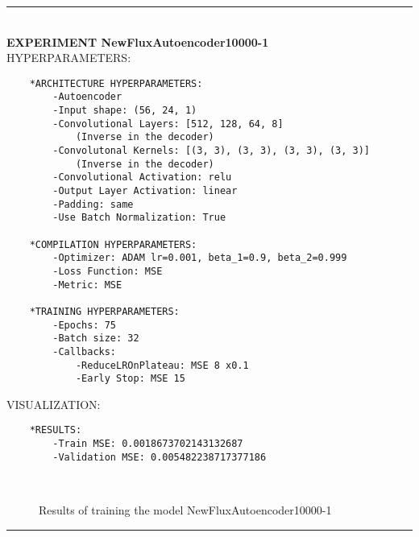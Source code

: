 \rule{0.5\textwidth}{0.5pt}\\

	{\large \textbf{EXPERIMENT NewFluxAutoencoder10000-1}}\\
	
	{\normalsize HYPERPARAMETERS:}
	\begin{lstlisting}
	*ARCHITECTURE HYPERPARAMETERS:
		-Autoencoder
		-Input shape: (56, 24, 1)
		-Convolutional Layers: [512, 128, 64, 8]
			(Inverse in the decoder)
		-Convolutonal Kernels: [(3, 3), (3, 3), (3, 3), (3, 3)] 
			(Inverse in the decoder)
		-Convolutional Activation: relu
		-Output Layer Activation: linear
		-Padding: same
		-Use Batch Normalization: True
	
	*COMPILATION HYPERPARAMETERS:
		-Optimizer: ADAM lr=0.001, beta_1=0.9, beta_2=0.999
		-Loss Function: MSE
		-Metric: MSE
	
	*TRAINING HYPERPARAMETERS:
		-Epochs: 75
		-Batch size: 32
		-Callbacks:
			-ReduceLROnPlateau: MSE 8 x0.1
			-Early Stop: MSE 15
	\end{lstlisting}
	
	{\normalsize VISUALIZATION:}
	\begin{lstlisting}
	*RESULTS:
        -Train MSE: 0.0018673702143132687
        -Validation MSE: 0.005482238717377186
	\end{lstlisting}
	
	\begin{figure*}[ht!]
		\hspace{\fill}
		\hspace{\fill}	
		\\
		\caption{Results of training the model NewFluxAutoencoder10000-1}
	\end{figure*}
	
\FloatBarrier	
\rule{0.5\textwidth}{0.5pt}\\